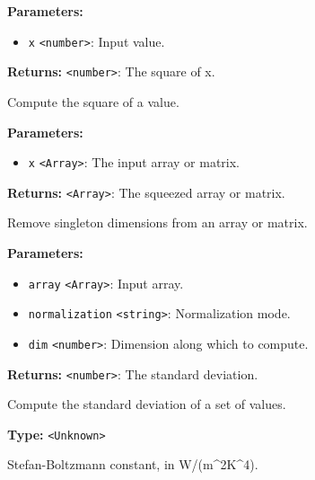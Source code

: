 \documentclass[12pt,a4paper]{article}
\begin{document}
\noindent \textbf{Parameters:}
\begin{itemize}
  \item \texttt{x} \texttt{<number>}: Input value.
\end{itemize}

\noindent \textbf{Returns:} \texttt{<number>}: The square of x.

\noindent Compute the square of a value.

\vspace{5mm}
\noindent {}


\noindent \textbf{Parameters:}
\begin{itemize}
  \item \texttt{x} \texttt{<Array>}: The input array or matrix.
\end{itemize}

\noindent \textbf{Returns:} \texttt{<Array>}: The squeezed array or matrix.

\noindent Remove singleton dimensions from an array or matrix.

\vspace{5mm}
\noindent {}


\noindent \textbf{Parameters:}
\begin{itemize}
  \item \texttt{array} \texttt{<Array>}: Input array.
  \item \texttt{normalization} \texttt{<string>}: Normalization mode.
  \item \texttt{dim} \texttt{<number>}: Dimension along which to compute.
\end{itemize}

\noindent \textbf{Returns:} \texttt{<number>}: The standard deviation.

\noindent Compute the standard deviation of a set of values.

\vspace{5mm}
\noindent {}\vspace{4mm}


\noindent \textbf{Type:} \texttt{<Unknown>}

\noindent Stefan-Boltzmann constant, in W/(m\textasciicircum{}2K\textasciicircum{}4).
\end{document}
